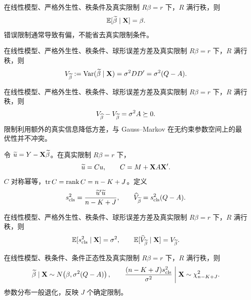 \begin{theorem}\label{reg:entry:77}
在线性模型、严格外生性、秩条件及真实限制 $R\beta=r$ 下，$R$ 满行秩，则
\[\mathbb{E}[\widetilde\beta\mid\mathbf{X}]=\beta.\]
错误限制通常导致有偏，不能省去真实限制条件。
\end{theorem}

\begin{theorem}\label{reg:entry:78}
在线性模型、严格外生性、秩条件、球形误差方差及真实限制 $R\beta=r$ 下，$R$ 满行秩，则
\[V_{\widetilde\beta}:=\operatorname{Var}(\widetilde\beta\mid\mathbf{X})=\sigma^2DD'=\sigma^2(Q-A).\]
\end{theorem}

\begin{theorem}[真实限制带来的方差改进]\label{reg:entry:79}
在线性模型、严格外生性、秩条件、球形误差方差及真实限制 $R\beta=r$ 下，$R$ 满行秩，则
\[V_{\widehat{\beta}}-V_{\widetilde\beta}=\sigma^2 A\succeq0.\]
限制利用额外的真实信息降低方差，与 Gauss--Markov 在无约束参数空间上的最优性并不冲突。
\end{theorem}

\begin{definition}\label{reg:entry:80}
令 $\widetilde u=Y-\mathbf{X}\widetilde\beta$。在真实限制 $R\beta=r$ 下，
\[\widetilde u=Cu,\qquad C=M+\mathbf{X} A\mathbf{X}'.\]
$C$ 对称幂等，$\operatorname{tr} C=\operatorname{rank} C=n-K+J$。定义
\[s_{\rm cls}^2=\frac{\widetilde u'\widetilde u}{n-K+J},\qquad \widehat V_{\widetilde\beta}=s_{\rm cls}^2(Q-A).\]
\end{definition}

\begin{theorem}\label{reg:entry:81}
在线性模型、严格外生性、秩条件、球形误差方差及真实限制 $R\beta=r$ 下，$R$ 满行秩，则
\[\mathbb{E}[s_{\rm cls}^2\mid\mathbf{X}]=\sigma^2,\qquad \mathbb{E}[\widehat V_{\widetilde\beta}\mid\mathbf{X}]=V_{\widetilde\beta}.\]
\end{theorem}

\begin{theorem}\label{reg:entry:82}
在线性模型、秩条件、条件正态性及真实限制 $R\beta=r$ 下，$R$ 满行秩，则
\[\widetilde\beta\mid\mathbf{X}\sim N\!\left(\beta,\sigma^2(Q-A)\right),\qquad
\frac{(n-K+J)s_{\rm cls}^2}{\sigma^2}\biggm|\mathbf{X}\sim\chi^2_{n-K+J}.\]
参数分布一般退化，反映 $J$ 个确定限制。
\end{theorem}

